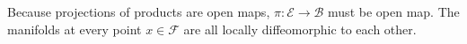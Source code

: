 Because projections of products are open maps, $\pi: \mathcal{E}\rightarrow \mathcal{B}$ must be open map. The manifolds at every point $x\in \mathcal{F}$ are all locally diffeomorphic to each other.








